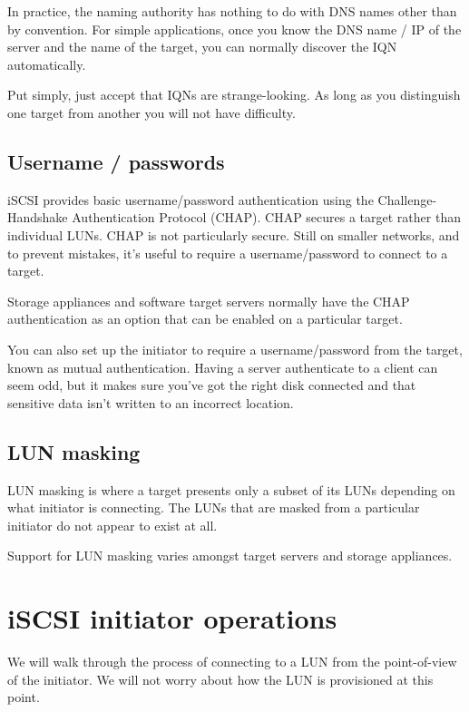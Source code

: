In practice, the naming authority has nothing to do with DNS names other
than by convention. For simple applications, once you know the DNS name
/ IP of the server and the name of the target, you can normally discover
the IQN automatically.

Put simply, just accept that IQNs are strange-looking. As long as you
distinguish one target from another you will not have difficulty.

\subsection{Username / passwords}\label{username-passwords}

iSCSI provides basic username/password authentication using the
Challenge-Handshake Authentication Protocol (CHAP). CHAP secures a
target rather than individual LUNs. CHAP is not particularly secure.
Still on smaller networks, and to prevent mistakes, it's useful to
require a username/password to connect to a target.

Storage appliances and software target servers normally have the CHAP
authentication as an option that can be enabled on a particular target.

You can also set up the initiator to require a username/password from
the target, known as mutual authentication. Having a server authenticate
to a client can seem odd, but it makes sure you've got the right disk
connected and that sensitive data isn't written to an incorrect
location.

\subsection{LUN masking}\label{lun-masking}

LUN masking is where a target presents only a subset of its LUNs
depending on what initiator is connecting. The LUNs that are masked from
a particular initiator do not appear to exist at all.

Support for LUN masking varies amongst target servers and storage
appliances.

\section{iSCSI initiator operations}\label{iscsi-initiator-operations}

We will walk through the process of connecting to a LUN from the
point-of-view of the initiator. We will not worry about how the LUN is
provisioned at this point.

